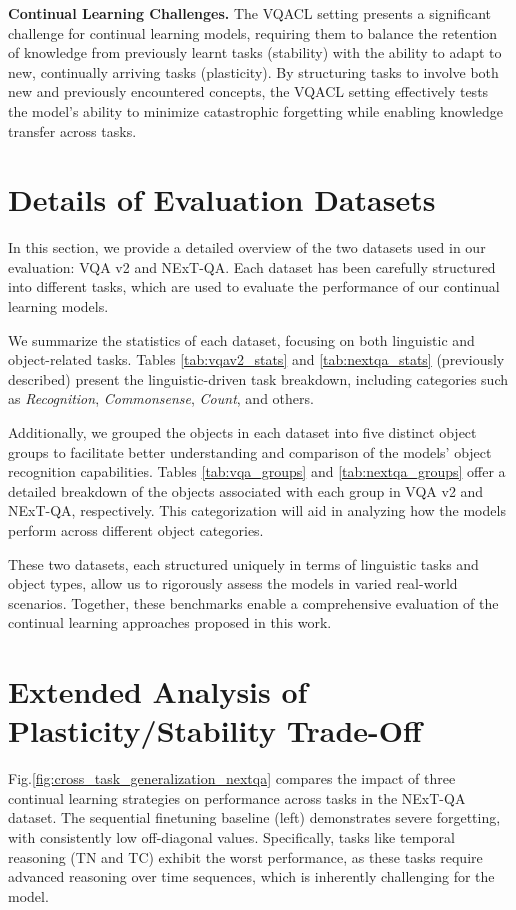 \noindent\textbf{Continual Learning Challenges.} The VQACL setting presents a significant challenge for continual learning models, requiring them to balance the retention of knowledge from previously learnt tasks (stability) with the ability to adapt to new, continually arriving tasks (plasticity). By structuring tasks to involve both new and previously encountered concepts, the VQACL setting effectively tests the model's ability to minimize catastrophic forgetting while enabling knowledge transfer across tasks.

\section{Details of Evaluation Datasets}
\label{sec:datasets_order}
In this section, we provide a detailed overview of the two datasets used in our evaluation: VQA v2 and NExT-QA. Each dataset has been carefully structured into different tasks, which are used to evaluate the performance of our continual learning models.

We summarize the statistics of each dataset, focusing on both linguistic and object-related tasks. Tables \ref{tab:vqav2_stats} and \ref{tab:nextqa_stats} (previously described) present the linguistic-driven task breakdown, including categories such as \textit{Recognition}, \textit{Commonsense}, \textit{Count}, and others.

Additionally, we grouped the objects in each dataset into five distinct object groups to facilitate better understanding and comparison of the models' object recognition capabilities. Tables \ref{tab:vqa_groups} and \ref{tab:nextqa_groups} offer a detailed breakdown of the objects associated with each group in VQA v2 and NExT-QA, respectively. This categorization will aid in analyzing how the models perform across different object categories.

These two datasets, each structured uniquely in terms of linguistic tasks and object types, allow us to rigorously assess the models in varied real-world scenarios. Together, these benchmarks enable a comprehensive evaluation of the continual learning approaches proposed in this work.

\section{Extended Analysis of Plasticity/Stability Trade-Off}
\label{extended_analysis}
Fig.\ref{fig:cross_task_generalization_nextqa} compares the impact of three continual learning strategies on performance across tasks in the NExT-QA dataset. The sequential finetuning baseline (left) demonstrates severe forgetting, with consistently low off-diagonal values. Specifically, tasks like temporal reasoning (TN and TC) exhibit the worst performance, as these tasks require advanced reasoning over time sequences, which is inherently challenging for the model.

